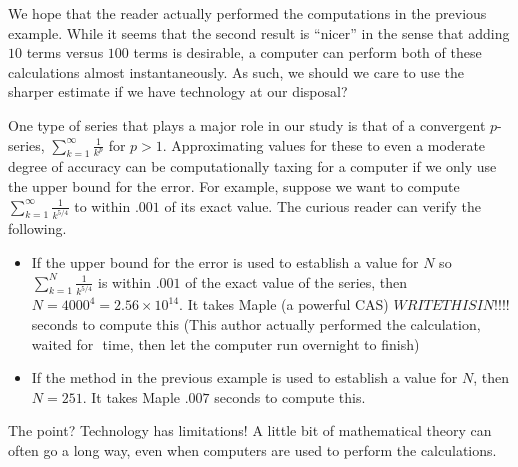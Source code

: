 \documentclass{ximera}
\begin{document}
\begin{remark}
We hope that the reader actually performed the computations in the previous example.  While it seems that the second result is ``nicer'' in the sense that adding $10$ terms versus $100$ terms is desirable, a computer can perform both of these calculations almost instantaneously.  As such, we should we care to use the sharper estimate if we have technology at our disposal?

One type of series that plays a major role in our study is that of a convergent $p$-series, $\sum_{k=1}^{\infty} \frac{1}{k^p}$ for $p >1$.  Approximating values for these to even a moderate degree of accuracy can be computationally taxing for a computer if we only use the upper bound for the error.  For example, suppose we want to compute $\sum_{k=1}^{\infty} \frac{1}{k^{5/4}}$ to within $.001$ of its exact value.  The curious reader can verify the following.

\begin{itemize}
\item If the upper bound for the error is used to establish a value for $N$ so $\sum_{k=1}^{N} \frac{1}{k^{5/4}}$ is within $.001$ of the exact value of the series, then $N = 4000^4 = 2.56 \times 10^{14}$.  It takes Maple (a powerful CAS) $WRITE THIS IN!!!! $ seconds to compute this (This author actually performed the calculation, waited for $ $ time, then let the computer run overnight to finish)
\item If the method in the previous example is used to establish a value for $N$, then $N=251$.   It takes Maple $.007$ seconds to compute this.
\end{itemize}

The point?  Technology has limitations!  A little bit of mathematical theory can often go a long way, even when computers are used to perform the calculations.

\end{remark}
\end{document}
